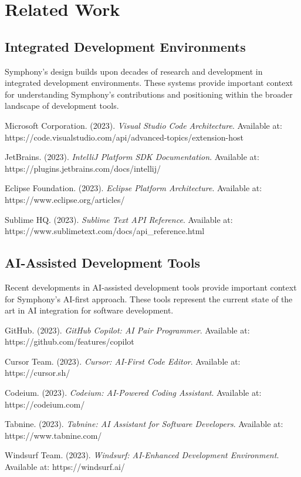 \section*{Related Work}

\subsection*{Integrated Development Environments}

Symphony's design builds upon decades of research and development in integrated development environments. These systems provide important context for understanding Symphony's contributions and positioning within the broader landscape of development tools.

\begin{compactlist}
    \item Microsoft Corporation. (2023). \textit{Visual Studio Code Architecture}. Available at: https://code.visualstudio.com/api/advanced-topics/extension-host
    \item JetBrains. (2023). \textit{IntelliJ Platform SDK Documentation}. Available at: https://plugins.jetbrains.com/docs/intellij/
    \item Eclipse Foundation. (2023). \textit{Eclipse Platform Architecture}. Available at: https://www.eclipse.org/articles/
    \item Sublime HQ. (2023). \textit{Sublime Text API Reference}. Available at: https://www.sublimetext.com/docs/api\_reference.html
\end{compactlist}

\subsection*{AI-Assisted Development Tools}

Recent developments in AI-assisted development tools provide important context for Symphony's AI-first approach. These tools represent the current state of the art in AI integration for software development.

\begin{compactlist}
    \item GitHub. (2023). \textit{GitHub Copilot: AI Pair Programmer}. Available at: https://github.com/features/copilot
    \item Cursor Team. (2023). \textit{Cursor: AI-First Code Editor}. Available at: https://cursor.sh/
    \item Codeium. (2023). \textit{Codeium: AI-Powered Coding Assistant}. Available at: https://codeium.com/
    \item Tabnine. (2023). \textit{Tabnine: AI Assistant for Software Developers}. Available at: https://www.tabnine.com/
    \item Windsurf Team. (2023). \textit{Windsurf: AI-Enhanced Development Environment}. Available at: https://windsurf.ai/
\end{compactlist}

